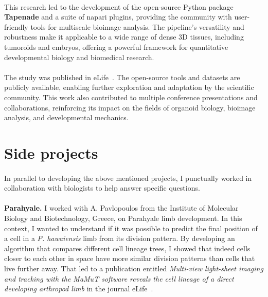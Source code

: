 \paragraph{}This research led to the development of the open-source Python package \textbf{Tapenade} and a suite of napari plugins, providing the community with user-friendly tools for multiscale bioimage analysis.
The pipeline’s versatility and robustness make it applicable to a wide range of dense 3D tissues, including tumoroids and embryos, offering a powerful framework for quantitative developmental biology and biomedical research.

\paragraph{}The study was published in eLife~\cite{Gros2025}. The open-source tools and datasets are publicly available, enabling further exploration and adaptation by the scientific community. This work also contributed to multiple conference presentations and collaborations, reinforcing its impact on the fields of organoid biology, bioimage analysis, and developmental mechanics.

\section{Side projects}
\paragraph{}In parallel to developing the above mentioned projects, I punctually worked in collaboration with biologists to help answer specific questions.
\paragraph{}\textbf{Parahyale.} I worked with A. Pavlopoulos from the Institute of Molecular Biology and Biotechnology, Greece, on Parahyale limb development.
In this context, I wanted to understand if it was possible to predict the final position of a cell in a \emph{P. hawaiensis} limb from its division pattern.
By developing an algorithm that compares different cell lineage trees, I showed that indeed cells closer to each other in space have more similar division patterns than cells that live further away.
That led to a publication entitled \emph{Multi-view light-sheet imaging and tracking with the MaMuT software reveals the cell lineage of a direct developing arthropod limb} in the journal eLife~\cite{Wolff:2018aa}.
